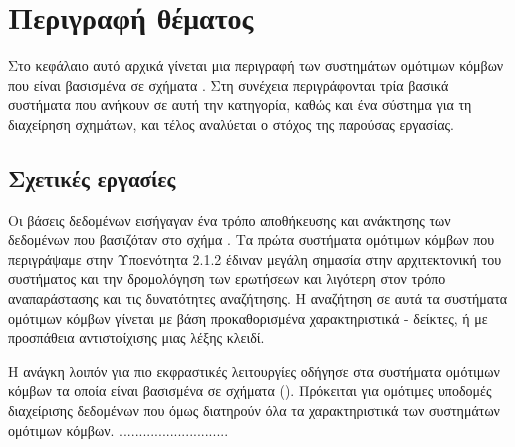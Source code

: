 \chapter{Περιγραφή θέματος}
Στο κεφάλαιο αυτό αρχικά γίνεται μια περιγραφή των συστημάτων
ομότιμων κόμβων που είναι βασισμένα σε σχήματα . Στη συνέχεια περιγράφονται τρία βασικά
συστήματα που ανήκουν σε αυτή την κατηγορία, καθώς και ένα σύστημα
για τη διαχείρηση  σχημάτων, και τέλος αναλύεται ο στόχος
της παρούσας εργασίας.

\section{Σχετικές εργασίες}
Οι βάσεις δεδομένων εισήγαγαν ένα τρόπο αποθήκευσης και ανάκτησης
των δεδομένων που βασιζόταν στο σχήμα \cite{neidl03issues}. Τα
πρώτα συστήματα ομότιμων κόμβων που περιγράψαμε στην Υποενότητα
2.1.2 έδιναν μεγάλη σημασία στην αρχιτεκτονική του συστήματος και
την δρομολόγηση των ερωτήσεων και λιγότερη στον τρόπο
αναπαράστασης και τις δυνατότητες αναζήτησης. Η αναζήτηση σε αυτά
τα συστήματα ομότιμων κόμβων γίνεται με βάση προκαθορισμένα
χαρακτηριστικά - δείκτες, ή με προσπάθεια αντιστοίχισης μιας λέξης
κλειδί.

Η ανάγκη λοιπόν για πιο εκφραστικές λειτουργίες οδήγησε στα
συστήματα ομότιμων κόμβων τα οποία είναι βασισμένα σε σχήματα
(). Πρόκειται για ομότιμες
υποδομές διαχείρισης δεδομένων που όμως διατηρούν όλα τα
χαρακτηριστικά των συστημάτων ομότιμων κόμβων.
............................
